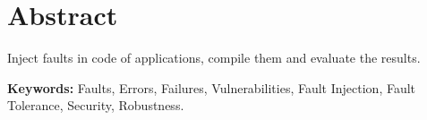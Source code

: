 \newpage
{}

\section*{Abstract}

Inject faults in code of applications, compile them and evaluate the results.




\textbf{Keywords:} Faults, Errors, Failures, Vulnerabilities, Fault Injection, Fault Tolerance, Security, Robustness.
